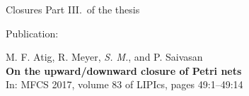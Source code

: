 \documentclass[../talk.tex]{subfiles}
\begin{document}
\begin{frame}{Closures}
    Part III.~of the thesis

    \vspace*{2.3em}

    \alert{Publication:}

    \vspace*{1em}

    M. F. Atig, R. Meyer, \textit{S. M.}, and P. Saivasan
    \\
    \textbf{On the upward/downward closure of Petri nets}
    \\
    In: MFCS 2017, volume 83 of LIPIcs, pages 49:1--49:14
\end{frame}
\end{document}
